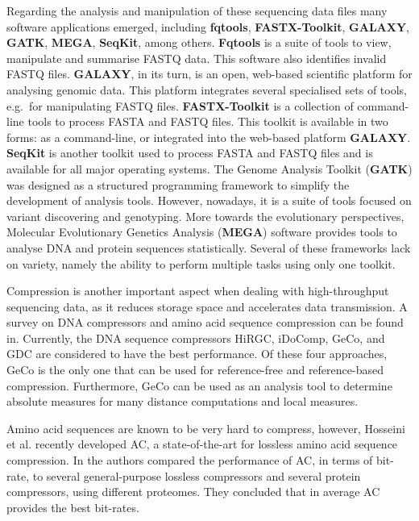 \documentclass[11pt,]{krantz}
\begin{document}
Regarding the analysis and manipulation of these sequencing data files
many software applications emerged, including
\textbf{fqtools}\citep{droop2016fqtools},
\textbf{FASTX-Toolkit}\citep{gordon2010fastx},
\textbf{GALAXY}\citep{afgan2018galaxy},
\textbf{GATK}\citep{depristo2011framework},
\textbf{MEGA}\citep{kumar2016mega7},
\textbf{SeqKit}\citep{shen2016seqkit}, among others. \textbf{Fqtools} is
a suite of tools to view, manipulate and summarise FASTQ data. This
software also identifies invalid FASTQ files\citep{droop2016fqtools}.
\textbf{GALAXY}, in its turn, is an open, web-based scientific platform
for analysing genomic data\citep{goecks2010galaxy}. This platform
integrates several specialised sets of tools, e.g.~for manipulating
FASTQ files\citep{blankenberg2010manipulation}. \textbf{FASTX-Toolkit}
is a collection of command-line tools to process FASTA and FASTQ files.
This toolkit is available in two forms: as a command-line, or integrated
into the web-based platform \textbf{GALAXY}\citep{gordon2010fastx}.
\textbf{SeqKit} is another toolkit used to process FASTA and FASTQ files
and is available for all major operating systems\citep{shen2016seqkit}.
The Genome Analysis Toolkit (\textbf{GATK}) was designed as a structured
programming framework to simplify the development of analysis tools.
However, nowadays, it is a suite of tools focused on variant discovering
and genotyping\citep{van2013fastq}. More towards the evolutionary
perspectives, Molecular Evolutionary Genetics Analysis (\textbf{MEGA})
software provides tools to analyse DNA and protein sequences
statistically\citep{tamura2011mega5}. Several of these frameworks lack
on variety, namely the ability to perform multiple tasks using only one
toolkit.

Compression is another important aspect when dealing with
high-throughput sequencing data, as it reduces storage space and
accelerates data transmission. A survey on DNA compressors and amino
acid sequence compression can be found in\citep{hosseini2016survey}.
Currently, the DNA sequence compressors HiRGC\citep{liu2017high},
iDoComp\citep{ochoa2014idocomp}, GeCo\citep{pratas2016efficient}, and
GDC\citep{deorowicz2015gdc} are considered to have the best
performance\citep{hernaez2019genomic}. Of these four approaches, GeCo is
the only one that can be used for reference-free and reference-based
compression. Furthermore, GeCo can be used as an analysis tool to
determine absolute measures for many distance computations and local
measures\citep{pratas2016efficient}.

Amino acid sequences are known to be very hard to
compress\citep{nalbantoglu2010data}, however, Hosseini et
al.\citep{hosseini2019ac} recently developed AC, a state-of-the-art for
lossless amino acid sequence compression.
In\citep{pratas2018compression} the authors compared the performance of
AC, in terms of bit-rate, to several general-purpose lossless
compressors and several protein compressors, using different proteomes.
They concluded that in average AC provides the best bit-rates.
\end{document}
